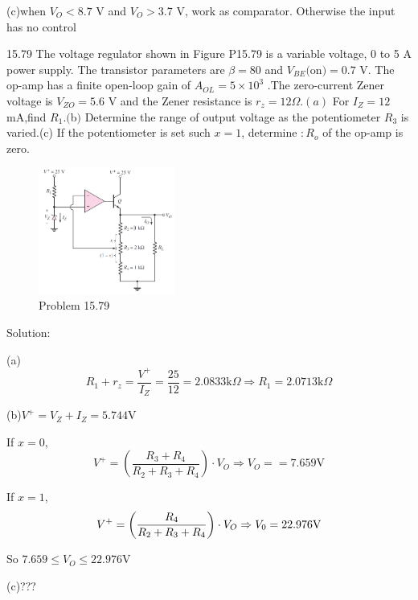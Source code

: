 \documentclass[a4paper,11pt,UTF8]{article}
\begin{document}
(c)when $V_O < 8.7$ V and $V_O>$3.7 V, work as comparator. Otherwise the input has no
control

15.79 The voltage regulator shown in Figure P15.79 is a variable voltage, 0 to 5 A
power supply. The transistor parameters are $\beta=80$ and $V_{BE}( $on$) = 0.7$ V. The op-amp has a finite open-loop gain of $A_{OL}=5\times10^3$ .The zero-current Zener voltage is $V_{ZO}=5.6$ V and the Zener resistance is $r_z=12\Omega.(a)$ For $I_Z= 12$mA,find $R_1.( $b$) $ Determine the range of output voltage as the potentiometer $R_{3}$ is varied.(c) If the potentiometer is set such $x= 1$, determine $:R_o$ of the op-amp is zero.
\begin{figure}[H]
	\centering
	\includegraphics[width=0.4\textwidth]{15.79}
	\caption{Problem 15.79}
\end{figure}
\noindent Solution:

(a)
$$R_1+r_z=\frac{V^+}{I_Z}=\frac{25}{12}=2.0833\mathrm{k}\Omega\Rightarrow R_1=2.0713\mathrm{k}\Omega$$

(b)$V^+=V_Z+I_Z=5.744\mathrm{V}$

If $x=0$,$$V^+=\left(\frac{R_3+R_4}{R_2+R_3+R_4}\right)·V_O\Rightarrow V_O==7.659\mathrm{V}$$

If $x=1$, \\
	$$V^+ =\left({\frac{R_{4}}{R_{2}+R_{3}+R_{4}}}\right)\cdot V_{O}\Rightarrow V_{0}=22.976\mathrm{V}  \\
	 $$
	 
So $7.659 \leq V_{O}\leq22.976\mathrm{V}$

(c)???
\end{document}
